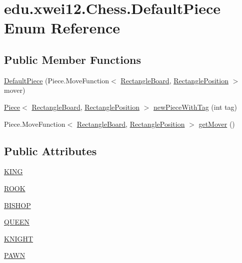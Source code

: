 \hypertarget{enumedu_1_1xwei12_1_1_chess_1_1_default_piece}{}\section{edu.\+xwei12.\+Chess.\+Default\+Piece Enum Reference}
\label{enumedu_1_1xwei12_1_1_chess_1_1_default_piece}
\subsection*{Public Member Functions}
\begin{DoxyCompactItemize}
\item 
\hyperlink{enumedu_1_1xwei12_1_1_chess_1_1_default_piece_a899452c56d374bdd9eae8f976d3b5787}{Default\+Piece} (Piece.\+Move\+Function$<$ \hyperlink{classedu_1_1xwei12_1_1_chess_1_1_rectangle_board}{Rectangle\+Board}, \hyperlink{classedu_1_1xwei12_1_1_chess_1_1_rectangle_position}{Rectangle\+Position} $>$ mover)
\item 
\hyperlink{classedu_1_1xwei12_1_1_chess_1_1_piece}{Piece}$<$ \hyperlink{classedu_1_1xwei12_1_1_chess_1_1_rectangle_board}{Rectangle\+Board}, \hyperlink{classedu_1_1xwei12_1_1_chess_1_1_rectangle_position}{Rectangle\+Position} $>$ \hyperlink{enumedu_1_1xwei12_1_1_chess_1_1_default_piece_aaceebd0f496a41760bf1d2eef3de93de}{new\+Piece\+With\+Tag} (int tag)
\item 
Piece.\+Move\+Function$<$ \hyperlink{classedu_1_1xwei12_1_1_chess_1_1_rectangle_board}{Rectangle\+Board}, \hyperlink{classedu_1_1xwei12_1_1_chess_1_1_rectangle_position}{Rectangle\+Position} $>$ \hyperlink{enumedu_1_1xwei12_1_1_chess_1_1_default_piece_ae378af48b0cf144c741617073a8f9207}{get\+Mover} ()
\end{DoxyCompactItemize}
\subsection*{Public Attributes}
\begin{DoxyCompactItemize}
\item 
\hyperlink{enumedu_1_1xwei12_1_1_chess_1_1_default_piece_aa20bf961672097f14b86457c896e4832}{K\+I\+NG}
\item 
\hyperlink{enumedu_1_1xwei12_1_1_chess_1_1_default_piece_acf677d8474e2029483774f08f3845b9b}{R\+O\+OK}
\item 
\hyperlink{enumedu_1_1xwei12_1_1_chess_1_1_default_piece_a126cf1ab581b587e90738827ef4f7782}{B\+I\+S\+H\+OP}
\item 
\hyperlink{enumedu_1_1xwei12_1_1_chess_1_1_default_piece_a2d54c1d306a8e1259ff5c807de83e3f8}{Q\+U\+E\+EN}
\item 
\hyperlink{enumedu_1_1xwei12_1_1_chess_1_1_default_piece_adc547e747617c6106290318e5cb0c9b9}{K\+N\+I\+G\+HT}
\item 
\hyperlink{enumedu_1_1xwei12_1_1_chess_1_1_default_piece_ab512e050b8996563bc82f51fad447f39}{P\+A\+WN}
\end{DoxyCompactItemize}


